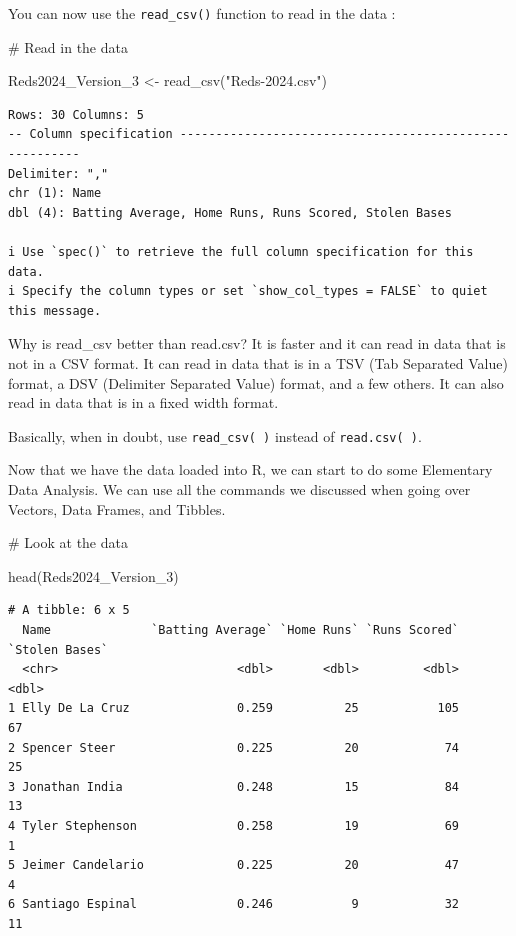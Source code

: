\documentclass[
  letterpaper,
  DIV=11,
  numbers=noendperiod]{scrreprt}
\newenvironment{Shaded}{\begin{snugshade}}{\end{snugshade}}
\newcommand{\CommentTok}[1]{\textcolor[rgb]{0.37,0.37,0.37}{#1}}
\newcommand{\FunctionTok}[1]{\textcolor[rgb]{0.28,0.35,0.67}{#1}}
\newcommand{\NormalTok}[1]{\textcolor[rgb]{0.00,0.23,0.31}{#1}}
\newcommand{\OtherTok}[1]{\textcolor[rgb]{0.00,0.23,0.31}{#1}}
\newcommand{\StringTok}[1]{\textcolor[rgb]{0.13,0.47,0.30}{#1}}
\begin{document}
You can now use the \texttt{read\_csv()} function to read in the data :

\begin{Shaded}
\begin{Highlighting}[]
\CommentTok{\# Read in the data}

\NormalTok{Reds2024\_Version\_3 }\OtherTok{\textless{}{-}} \FunctionTok{read\_csv}\NormalTok{(}\StringTok{"Reds{-}2024.csv"}\NormalTok{)}
\end{Highlighting}
\end{Shaded}

\begin{verbatim}
Rows: 30 Columns: 5
-- Column specification --------------------------------------------------------
Delimiter: ","
chr (1): Name
dbl (4): Batting Average, Home Runs, Runs Scored, Stolen Bases

i Use `spec()` to retrieve the full column specification for this data.
i Specify the column types or set `show_col_types = FALSE` to quiet this message.
\end{verbatim}

Why is read\_csv better than read.csv? It is faster and it can read in
data that is not in a CSV format. It can read in data that is in a TSV
(Tab Separated Value) format, a DSV (Delimiter Separated Value) format,
and a few others. It can also read in data that is in a fixed width
format.

Basically, when in doubt, use \texttt{read\_csv(\ )} instead of
\texttt{read.csv(\ )}.

Now that we have the data loaded into R, we can start to do some
Elementary Data Analysis. We can use all the commands we discussed when
going over Vectors, Data Frames, and Tibbles.

\begin{Shaded}
\begin{Highlighting}[]
\CommentTok{\# Look at the data}

\FunctionTok{head}\NormalTok{(Reds2024\_Version\_3)}
\end{Highlighting}
\end{Shaded}

\begin{verbatim}
# A tibble: 6 x 5
  Name              `Batting Average` `Home Runs` `Runs Scored` `Stolen Bases`
  <chr>                         <dbl>       <dbl>         <dbl>          <dbl>
1 Elly De La Cruz               0.259          25           105             67
2 Spencer Steer                 0.225          20            74             25
3 Jonathan India                0.248          15            84             13
4 Tyler Stephenson              0.258          19            69              1
5 Jeimer Candelario             0.225          20            47              4
6 Santiago Espinal              0.246           9            32             11
\end{verbatim}
\end{document}
